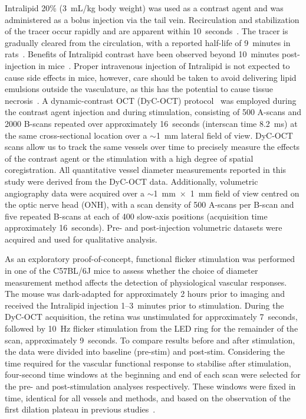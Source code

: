 \documentclass{optica-article}
\begin{document}
Intralipid 20\% (3~mL/kg body weight) was used as a contrast agent and was administered as a bolus injection via the tail vein. Recirculation and stabilization of the tracer occur rapidly and are apparent within 10~seconds~\cite{merkleDynamicContrastOptical2016}. The tracer is gradually cleared from the circulation, with a reported half-life of 9~minutes in rats~\cite{liuNewApproachDeliver2017}. Benefits of Intralipid contrast have been observed beyond 10~minutes post-injection in mice~\cite{patelBloodFlowAnalysis2026}. Proper intravenous injection of Intralipid is not expected to cause side effects in mice, however, care should be taken to avoid delivering lipid emulsions outside the vasculature, as this has the potential to cause tissue necrosis~\cite{graberMassiveSubcutaneousFat1964}. A dynamic-contrast OCT (DyC-OCT) protocol~\cite{merkleLaminarMicrovascularTransit2016} was employed during the contrast agent injection and during stimulation, consisting of 500 A-scans and 2000 B-scans repeated over approximately 16~seconds (interscan time 8.2~ms) at the same cross-sectional location over a $\sim$1~mm lateral field of view. DyC-OCT scans allow us to track the same vessels over time to precisely measure the effects of the contrast agent or the stimulation with a high degree of spatial coregistration. All quantitative vessel diameter measurements reported in this study were derived from the DyC-OCT data. Additionally, volumetric angiography data were acquired over a $\sim$1~mm~$\times$~1~mm field of view centred on the optic nerve head (ONH), with a scan density of 500 A-scans per B-scan and five repeated B-scans at each of 400 slow-axis positions (acquisition time approximately 16~seconds). Pre- and post-injection volumetric datasets were acquired and used for qualitative analysis.

As an exploratory proof-of-concept, functional flicker stimulation was performed in one of the C57BL/6J mice to assess whether the choice of diameter measurement method affects the detection of physiological vascular responses. The mouse was dark-adapted for approximately 2 hours prior to imaging and received the Intralipid injection 1--3~minutes prior to stimulation. During the DyC-OCT acquisition, the retina was unstimulated for approximately 7~seconds, followed by 10~Hz flicker stimulation from the LED ring for the remainder of the scan, approximately 9~seconds. To compare results before and after stimulation, the data were divided into baseline (pre-stim) and post-stim. Considering the time required for the vascular functional response to stabilise after stimulation, four-second time windows at the beginning and end of each scan were selected for the pre- and post-stimulation analyses respectively. These windows were fixed in time, identical for all vessels and methods, and based on  the observation of the first dilation plateau in previous studies~\cite{radhakrishnanMultiparametricOpticalCoherence2013,sonFunctionalOCTReveals2024}.
\end{document}
